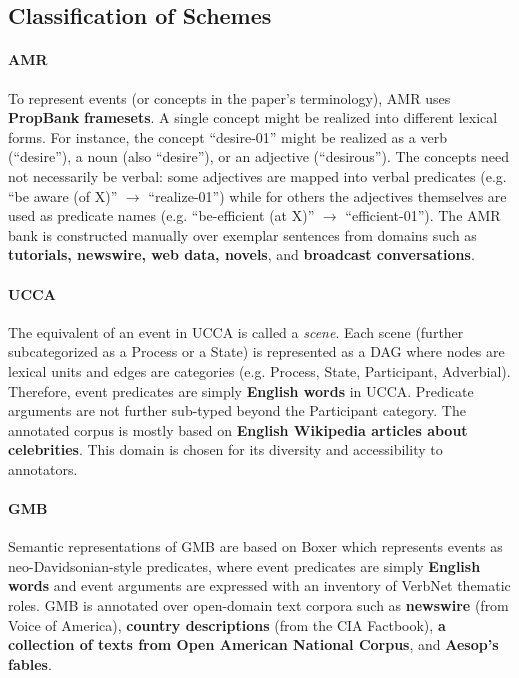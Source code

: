 \documentclass[11pt,a4paper]{article}
\begin{document}
\subsection{Classification of Schemes}
\paragraph*{AMR}
To represent events (or concepts in the paper's terminology), AMR \cite{banarescu-etal-2013-abstract} uses \textbf{PropBank} \cite{kingsbury-palmer-2002-treebank,palmer-etal-2005-proposition} \textbf{framesets}. A single concept might be realized into different lexical forms. For instance, the concept ``desire-01'' might be realized as a verb (``desire''), a noun (also ``desire''), or an adjective (``desirous''). The concepts need not necessarily be verbal: some adjectives are mapped into verbal predicates (e.g. ``be aware (of X)'' $\rightarrow$ ``realize-01'') while for others the adjectives themselves are used as predicate names (e.g. ``be-efficient (at X)'' $\rightarrow$ ``efficient-01''). The AMR bank is constructed manually over exemplar sentences from domains such as \textbf{tutorials, newswire, web data, novels}, and \textbf{broadcast conversations}.

\paragraph*{UCCA}
The equivalent of an event in UCCA \cite{abend-rappoport-2013-universal} is called a \textit{scene}. Each  scene (further subcategorized as a Process or a State) is represented as a DAG where nodes are lexical units and edges are categories (e.g. Process, State, Participant, Adverbial). Therefore, event predicates are simply \textbf{English words} in UCCA. Predicate arguments are not further sub-typed beyond the Participant category. The annotated corpus is mostly  based on \textbf{English Wikipedia articles about celebrities}. This domain is chosen for its diversity and accessibility to annotators.

\paragraph*{GMB} Semantic representations of GMB \cite{basile-etal-2012-developing} are based on Boxer \cite{bos-2008-wide} which represents events as neo-Davidsonian-style predicates, where event predicates are simply \textbf{English words} and event arguments are expressed with an inventory of VerbNet \cite{kipper2008large} thematic roles. GMB is annotated over open-domain text corpora such as \textbf{newswire} (from Voice of America), \textbf{country descriptions} (from the CIA Factbook), \textbf{a collection of texts from Open American National Corpus}, and \textbf{Aesop's fables}.
\end{document}
